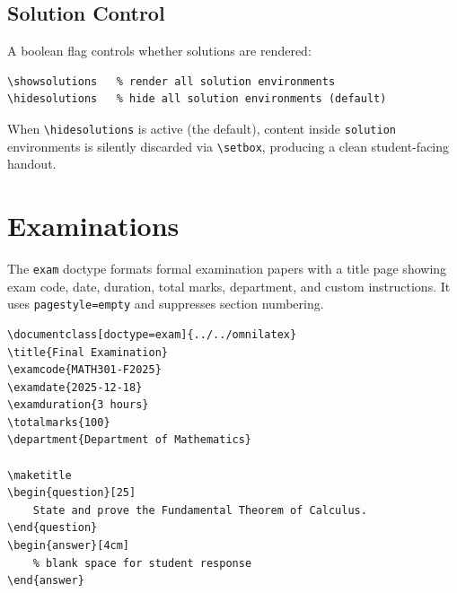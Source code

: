 \subsection{Solution Control}

A boolean flag controls whether solutions are rendered:

\begin{verbatim}
\showsolutions   % render all solution environments
\hidesolutions   % hide all solution environments (default)
\end{verbatim}

When \texttt{\textbackslash hidesolutions} is active (the default), content
inside \texttt{solution} environments is silently discarded via
\texttt{\textbackslash setbox}, producing a clean student-facing handout.

\section{Examinations}
\label{sec:exam}

The \texttt{exam} doctype formats formal examination papers with a title
page showing exam code, date, duration, total marks, department, and
custom instructions.  It uses \texttt{pagestyle=empty} and suppresses
section numbering.

\begin{verbatim}
\documentclass[doctype=exam]{../../omnilatex}
\title{Final Examination}
\examcode{MATH301-F2025}
\examdate{2025-12-18}
\examduration{3 hours}
\totalmarks{100}
\department{Department of Mathematics}

\maketitle
\begin{question}[25]
    State and prove the Fundamental Theorem of Calculus.
\end{question}
\begin{answer}[4cm]
    % blank space for student response
\end{answer}

\end{verbatim}

